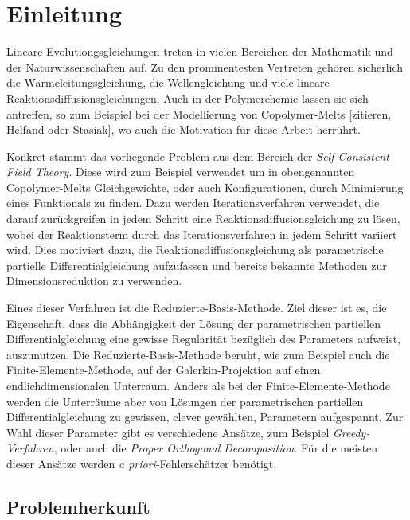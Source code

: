 
\chapter*{Einleitung} %
\label{cha:einleitung}

Lineare Evolutiongsgleichungen treten in vielen Bereichen der Mathematik und der Naturwissenschaften auf.
Zu den prominentesten Vertreten gehören sicherlich die Wärmeleitungsgleichung, die Wellengleichung und viele lineare Reaktionsdiffusionsgleichungen.
Auch in der Polymerchemie lassen sie sich antreffen, so zum Beispiel bei der Modellierung von Copolymer-Melts [zitieren, Helfand oder Stasiak], wo auch die Motivation für diese Arbeit herrührt.

Konkret stammt das vorliegende Problem aus dem Bereich der \emph{Self Consistent Field Theory}.
Diese wird zum Beispiel verwendet um in obengenannten Copolymer-Melts Gleichgewichte, oder auch Konfigurationen, durch Minimierung eines Funktionals zu finden.
Dazu werden Iterationsverfahren verwendet, die darauf zurückgreifen in jedem Schritt eine Reaktionsdiffusionsgleichung zu lösen, wobei der Reaktionsterm durch das Iterationsverfahren in jedem Schritt variiert wird.
Dies motiviert dazu, die Reaktionsdiffusionsgleichung als parametrische partielle Differentialgleichung aufzufassen und bereits bekannte Methoden zur Dimensionsreduktion zu verwenden.

Eines dieser Verfahren ist die Reduzierte-Basis-Methode.
Ziel dieser ist es, die Eigenschaft, dass die Abhängigkeit der Lösung der parametrischen partiellen Differentialgleichung eine gewisse Regularität bezüglich des Parameters aufweist, auszunutzen.
Die Reduzierte-Basis-Methode beruht, wie zum Beispiel auch die Finite-Elemente-Methode, auf der Galerkin-Projektion auf einen endlichdimensionalen Unterraum.
Anders als bei der Finite-Elemente-Methode werden die Unterräume aber von Lösungen der parametrischen partiellen Differentialgleichung zu gewissen, clever gewählten, Parametern aufgespannt.
Zur Wahl dieser Parameter gibt es verschiedene Ansätze, zum Beispiel \emph{Greedy-Verfahren}, oder auch die \emph{Proper Orthogonal Decomposition}.
Für die meisten dieser Ansätze werden \emph{a priori}-Fehlerschätzer benötigt.

\section{Problemherkunft} %
\label{sec:problemherkunft}

